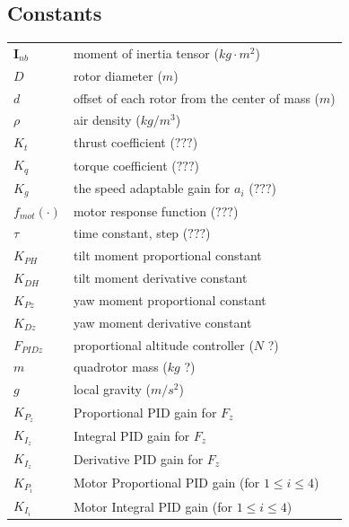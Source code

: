 \documentclass{article}
\numberwithin{equation}{section} %
\newcommand{\bs}[1]{\boldsymbol{#1}}
\begin{document}
\subsection{Constants}

\begin{longtable}{p{2cm}p{8cm}}
 	$ \bs{I}_{nb} $			& moment of inertia tensor ($kg \cdot m^{2}$) \\
 	$ D $ 					& rotor diameter ($m$) \\
 	$ d $					& offset of each rotor from the center of mass ($m$) \\
 	$ \rho $				& air density ($kg/m^3$) \\
 	$ K_t $					& thrust coefficient ($???$) \\
 	$ K_q $					& torque coefficient ($???$) \\
 	$ K_g $					& the speed adaptable gain for $a_i$ ($???$) \\
 	$ f_{mot}( \cdot ) $	& motor response function ($???$) \\
 	$ \tau $				& time constant, step ($???$) \\
 	$K_{PH} $				& tilt moment proportional constant \\
 	$K_{DH} $				& tilt moment derivative constant \\
 	$K_{Pz} $				& yaw moment proportional constant \\
 	$K_{Dz} $				& yaw moment derivative constant \\
 	$F_{PIDz} $				& proportional altitude controller ($N$ ?) \\
 	$m$						& quadrotor mass ($kg$ ?) \\
 	$g$						& local gravity ($m/s^2$) \\
 	$K_{P_z}$				& Proportional PID gain for $F_z$ \\
	$K_{I_z}$				& Integral PID gain for $F_z$ \\
	$K_{I_z}$				& Derivative PID gain for $F_z$ \\
 	$ K_{P_i} $				& Motor Proportional PID gain (for $1 \leq i \leq 4$) \\
 	$ K_{I_i} $				& Motor Integral PID gain (for $1 \leq i \leq 4$) \\
 	
\end{longtable}

\end{document}
